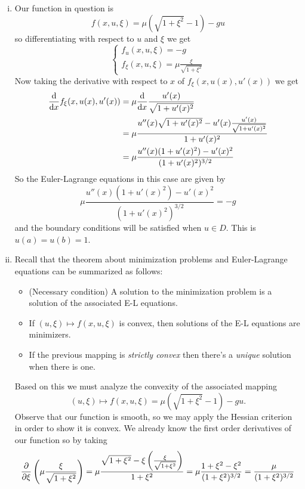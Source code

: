 \documentclass[12pt]{memoir}
\begin{document}
\begin{ptcbr}
    \begin{enumerate}[i)]
        \item Our function in question is 
        $$f(x,u,\xi)=\mu\left(\sqrt{1+\xi^2}-1\right)-gu$$
        so differentiating with respect to $u$ and $\xi$ we get 
        $$
        \begin{cases}
            f_u(x,u,\xi)=-g\\
            f_\xi(x,u,\xi)=\mu\frac{\xi}{\sqrt{1+\xi^2}}
        \end{cases}
        $$
        Now taking the derivative with respect to $x$ of $f_{\xi}(x,u(x),u'(x))$ we get 
        \begin{align*}
            \dv{x}f_{\xi}(x,u(x),u'(x))&=\mu\dv{x}\frac{u'(x)}{\sqrt{1+u'(x)^2}}\\
            &=\mu\frac{u''(x)\sqrt{1+u'(x)^2}-u'(x)\frac{u'(x)}{\sqrt{1+u'(x)^2}}}{1+u'(x)^2}\\
            &=\mu\frac{u''(x)(1+u'(x)^2)-u'(x)^2}{(1+u'(x)^2)^{3/2}}
        \end{align*}
    So the Euler-Lagrange equations in this case are given by
    $$\mu\frac{u''(x)(1+u'(x)^2)-u'(x)^2}{(1+u'(x)^2)^{3/2}}=-g$$
    and the boundary conditions will be satisfied when $u\in D$. This is $u(a)=u(b)=1$. %
    \item Recall that the theorem about minimization problems and Euler-Lagrange equations can be summarized as follows:
    \begin{itemize}
        \item (Necessary condition) A solution to the minimization problem is a solution of the associated E-L equations.
        \item If $(u,\xi)\mapsto f(x,u,\xi)$ is convex, then solutions of the E-L equations are minimizers.
        \item If the previous mapping is \emph{strictly convex} then there's a \emph{unique} solution when there is one.
    \end{itemize}
    Based on this we must analyze the convexity of the associated mapping
    $$(u,\xi)\mapsto f(x,u,\xi)=\mu\left(\sqrt{1+\xi^2}-1\right)-gu.$$
    Observe that our function is smooth, so we may apply the Hessian criterion in order to show it is convex. We already know the first order derivatives of our function so by taking 
    $$\pdv{\xi}\left(\mu\frac{\xi}{\sqrt{1+\xi^2}}\right)=\mu\frac{\sqrt{1+\xi^2}-\xi\left(\frac{\xi}{\sqrt{1+\xi^2}}\right)}{1+\xi^2}=\mu\frac{1+\xi^2-\xi^2}{(1+\xi^2)^{3/2}}=\frac{\mu}{(1+\xi^2)^{3/2}}$$

\end{enumerate}
\end{ptcbr}
\end{document}
